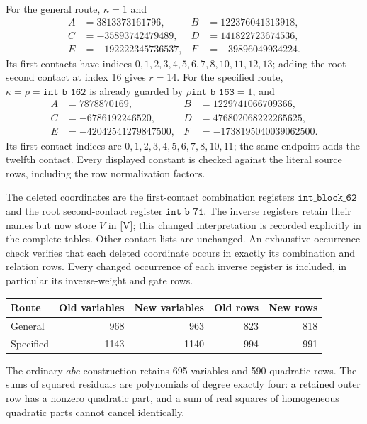 \documentclass[11pt]{article}
\begin{document}
For the general route, $\kappa=1$ and
\begin{align*}
 A&=3813373161796,&B&=122376041313918,\\
 C&=-35893742479489,&D&=141822723674536,\\
 E&=-192222345736537,&F&=-39896049934224.
\end{align*}
Its first contacts have indices
$0,1,2,3,4,5,6,7,8,10,11,12,13$; adding the root second contact
at index 16 gives $r=14$. For the specified route,
$\kappa=\rho=\mathtt{int\_b\_162}$ is already guarded by
$\rho\mathtt{int\_b\_163}=1$, and
\begin{align*}
 A&=7878870169,&B&=1229741066709366,\\
 C&=-6786192246520,&D&=476802068222265625,\\
 E&=-42042541279847500,&F&=-1738195040039062500.
\end{align*}
Its first contact indices are
$0,1,2,3,4,5,6,7,8,10,11$; the same endpoint adds the twelfth
contact. Every displayed constant is checked against the literal
source rows, including the row normalization factors.

The deleted coordinates are the first-contact combination registers
$\mathtt{int\_block\_62}$ and the root second-contact register
$\mathtt{int\_b\_71}$. The inverse registers retain their names but
now store $V$ in \eqref{V}; this changed interpretation is recorded
explicitly in the complete tables. Other contact lists are unchanged.
An exhaustive occurrence check verifies that each deleted coordinate
occurs in exactly its combination and relation rows. Every changed
occurrence of each inverse register is included, in particular its
inverse-weight and gate rows.

\begin{center}
\begin{tabular}{lrrrr}
\toprule
Route & Old variables & New variables & Old rows & New rows\\
\midrule
General & 968 & 963 & 823 & 818\\
Specified & 1143 & 1140 & 994 & 991\\
\bottomrule
\end{tabular}
\end{center}
The ordinary-$abc$ construction retains 695 variables and 590 quadratic
rows. The sums of squared residuals
are polynomials of degree exactly four: a retained outer row has a
nonzero quadratic part, and a sum of real squares of homogeneous
quadratic parts cannot cancel identically.
\end{document}
